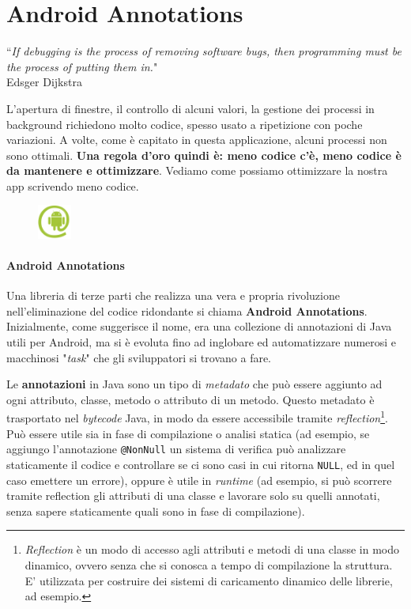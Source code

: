 \documentclass[a4paper,10pt]{memoir}
\begin{document}
\section{Android Annotations}
\label{section:aa}

\begin{flushright}
``\textit{If debugging is the process of removing software bugs, then programming must be the process of putting them in.}" \\ Edsger Dijkstra
\end{flushright}

L'apertura di finestre, il controllo di alcuni valori, la gestione dei processi in background richiedono molto codice, spesso usato a ripetizione con poche variazioni. A volte, come è capitato in questa applicazione, alcuni processi non sono ottimali. \textbf{Una regola d'oro quindi è: meno codice c'è, meno codice è da mantenere e ottimizzare}. Vediamo come possiamo ottimizzare la nostra app scrivendo meno codice.


\begin{figure}
\includegraphics[width=0.10\textwidth]{dev/aa}
\end{figure}

\paragraph{Android Annotations} Una libreria di terze parti che realizza una vera e propria rivoluzione nell'eliminazione del codice ridondante si chiama \textbf{Android Annotations}. Inizialmente, come suggerisce il nome, era una collezione di annotazioni di Java utili per Android, ma si è evoluta fino ad inglobare ed automatizzare numerosi e macchinosi "\textit{task}" che gli sviluppatori si trovano a fare.

\medskip

Le \textbf{annotazioni} in Java sono un tipo di \textit{metadato} che può essere aggiunto ad ogni attributo, classe, metodo o attributo di un metodo. Questo metadato è trasportato nel \textit{bytecode} Java, in modo da essere accessibile tramite \textit{reflection}\footnote{\textit{Reflection} è un modo di accesso agli attributi e metodi di una classe in modo dinamico, ovvero senza che si conosca a tempo di compilazione la struttura. E' utilizzata per costruire dei sistemi di caricamento dinamico delle librerie, ad esempio.}. Può essere utile sia in fase di compilazione o analisi statica (ad esempio, se aggiungo l'annotazione \texttt{@NonNull} un sistema di verifica può analizzare staticamente il codice e controllare se ci sono casi in cui ritorna \texttt{NULL}, ed in quel caso emettere un errore), oppure è utile in \textit{runtime} (ad esempio, si può scorrere tramite reflection gli attributi di una classe e lavorare solo su quelli annotati, senza sapere staticamente quali sono in fase di compilazione).
\end{document}
